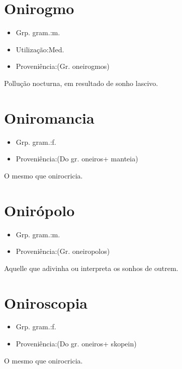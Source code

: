 \section{Onirogmo}
\begin{itemize}
\item {Grp. gram.:m.}
\end{itemize}
\begin{itemize}
\item {Utilização:Med.}
\end{itemize}
\begin{itemize}
\item {Proveniência:(Gr. \textunderscore oneirogmos\textunderscore )}
\end{itemize}
Pollução nocturna, em resultado de sonho lascivo.
\section{Oniromancia}
\begin{itemize}
\item {Grp. gram.:f.}
\end{itemize}
\begin{itemize}
\item {Proveniência:(Do gr. \textunderscore oneiros\textunderscore  + \textunderscore manteia\textunderscore )}
\end{itemize}
O mesmo que \textunderscore onirocricia\textunderscore .
\section{Onirópolo}
\begin{itemize}
\item {Grp. gram.:m.}
\end{itemize}
\begin{itemize}
\item {Proveniência:(Gr. \textunderscore oneiropolos\textunderscore )}
\end{itemize}
Aquelle que adivinha ou interpreta os sonhos de outrem.
\section{Oniroscopia}
\begin{itemize}
\item {Grp. gram.:f.}
\end{itemize}
\begin{itemize}
\item {Proveniência:(Do gr. \textunderscore oneiros\textunderscore  + \textunderscore skopein\textunderscore )}
\end{itemize}
O mesmo que \textunderscore onirocricia\textunderscore .
